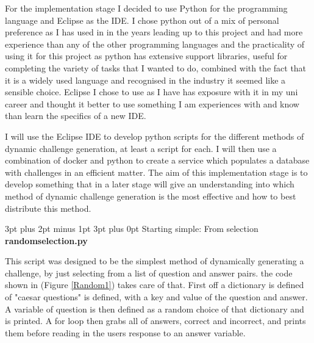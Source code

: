\documentclass[12pt,a4paper]{article}
\makeatletter
\renewcommand\subsection{\@startsection {subsection}{1}{2mm} %
                               {3pt plus 2pt minus 1pt} %
                               {3pt plus 0pt} %
                               {\normalfont\bfseries}}
\makeatother
\begin{document}
For the implementation stage I decided to use Python for the programming language and Eclipse as the IDE. I chose python out of a mix of personal preference as I has used in in the years leading up to this project and had more experience than any of the other programming languages and the practicality of using it for this project as python has extensive support libraries, useful for completing the variety of tasks that I wanted to do, combined with the fact that it is a widely used language and recognised in the industry it seemed like a sensible choice. Eclipse I chose to use as I have has exposure with it in my uni career and thought it better to use something I am experiences with and know than learn the specifics of a new IDE.

I will use the Eclipse IDE to develop python scripts for the different methods of dynamic challenge generation, at least a script for each. I will then use a combination of docker and python to create a service which populates a database with challenges in an efficient matter. The aim of this implementation stage is to develop something that in a later stage will give an understanding into which method of dynamic challenge generation is the most effective and how to best distribute this method.   


\subsection{Starting simple: From selection}  
\textbf{random\textunderscore selection.py}  

This script was designed to be the simplest method of dynamically generating a challenge, by just selecting from a list of question and answer pairs. the code shown in (Figure \ref{Random1}) takes care of that. First off a dictionary is defined of "caesar questions" is defined, with a key and value of the question and answer. A variable of question is then defined as a random choice of that dictionary and is printed. A for loop then grabs all of answers, correct and incorrect, and prints them before reading in the users response to an answer variable. 
\end{document}
